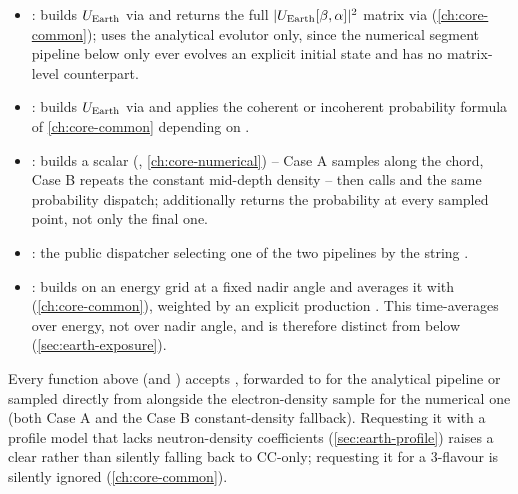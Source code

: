 \begin{implbox}
\begin{itemize}
  \item {}:
    builds $U_{\rm Earth}$ via  and returns the full
    $|U_{\rm Earth}[\beta,\alpha]|^2$ matrix via
    (\cref{ch:core-common}); uses the analytical evolutor only, since the
    numerical segment pipeline below only ever evolves an explicit initial
    state and has no matrix-level counterpart.
  \item {}:
    builds $U_{\rm Earth}$ via  and applies the
    coherent or incoherent probability formula of \cref{ch:core-common}
    depending on .
  \item {}:
    builds a scalar  (,
    \cref{ch:core-numerical}) -- Case A samples
     along the chord, Case B repeats
    the constant mid-depth density -- then calls 
    and the same probability dispatch; 
    additionally returns the probability at every sampled point, not only
    the final one.
  \item {}: the public dispatcher
    selecting one of the two pipelines by the string .
  \item {}:
    builds  on an energy grid at a fixed
    nadir angle and averages it with
    (\cref{ch:core-common}), weighted by an explicit production
    . This time-averages over energy, not over nadir angle,
    and is therefore distinct from 
    below (\cref{sec:earth-exposure}).
\end{itemize}
\end{implbox}

\begin{implbox}
Every function above (and ) accepts
, forwarded to  for
the analytical pipeline or sampled directly from
 alongside the electron-density sample
for the numerical one (both Case A and the Case B constant-density
fallback). Requesting it with a profile model that lacks neutron-density
coefficients (\cref{sec:earth-profile}) raises a clear 
rather than silently falling back to CC-only; requesting it for a
3-flavour  is silently ignored (\cref{ch:core-common}).
\end{implbox}

